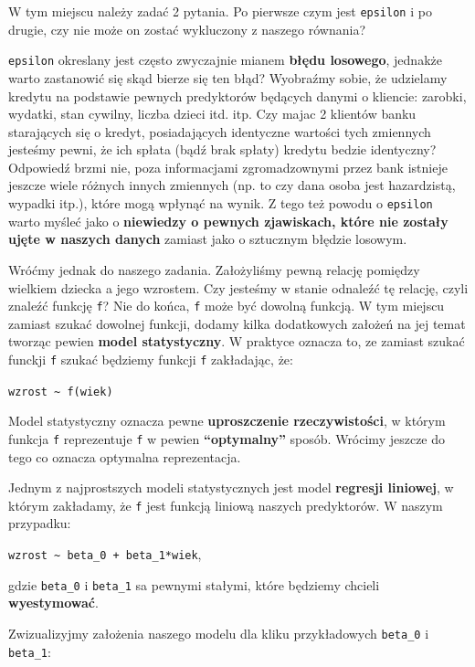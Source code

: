 \documentclass[
]{article}
\begin{document}
W tym miejscu należy zadać 2 pytania. Po pierwsze czym jest
\texttt{epsilon} i po drugie, czy nie może on zostać wykluczony z
naszego równania?

\texttt{epsilon} okreslany jest często zwyczajnie mianem \textbf{błędu
losowego}, jednakże warto zastanowić się skąd bierze się ten błąd?
Wyobraźmy sobie, że udzielamy kredytu na podstawie pewnych predyktorów
będących danymi o kliencie: zarobki, wydatki, stan cywilny, liczba
dzieci itd. itp. Czy majac 2 klientów banku starających się o kredyt,
posiadających identyczne wartości tych zmiennych jesteśmy pewni, że ich
spłata (bądź brak spłaty) kredytu bedzie identyczny? Odpowiedź brzmi
nie, poza informacjami zgromadzownymi przez bank istnieje jeszcze wiele
różnych innych zmiennych (np. to czy dana osoba jest hazardzistą,
wypadki itp.), które mogą wpłynąć na wynik. Z tego też powodu o
\texttt{epsilon} warto myśleć jako o \textbf{niewiedzy o pewnych
zjawiskach, które nie zostały ujęte w naszych danych} zamiast jako o
sztucznym błędzie losowym.

Wróćmy jednak do naszego zadania. Założyliśmy pewną relację pomiędzy
wielkiem dziecka a jego wzrostem. Czy jesteśmy w stanie odnaleźć tę
relację, czyli znaleźć funkcję \texttt{f}? Nie do końca, \texttt{f} może
być dowolną funkcją. W tym miejscu zamiast szukać dowolnej funkcji,
dodamy kilka dodatkowych założeń na jej temat tworząc pewien
\textbf{model statystyczny}. W praktyce oznacza to, ze zamiast szukać
funckji \texttt{f} szukać będziemy funkcji \texttt{f\textquotesingle{}}
zakładając, że:

\texttt{wzrost\ \textasciitilde{}\ f\textquotesingle{}(wiek)}

Model statystyczny oznacza pewne \textbf{uproszczenie rzeczywistości}, w
którym funkcja \texttt{f\textquotesingle{}} reprezentuje \texttt{f} w
pewien \textbf{``optymalny''} sposób. Wrócimy jeszcze do tego co oznacza
optymalna reprezentacja.

Jednym z najprostszych modeli statystycznych jest model \textbf{regresji
liniowej}, w którym zakładamy, że \texttt{f\textquotesingle{}} jest
funkcją liniową naszych predyktorów. W naszym przypadku:

\texttt{wzrost\ \textasciitilde{}\ beta\_0\ +\ beta\_1*wiek},

gdzie \texttt{beta\_0} i \texttt{beta\_1} sa pewnymi stałymi, które
będziemy chcieli \textbf{wyestymować}.

Zwizualizyjmy założenia naszego modelu dla kliku przykładowych
\texttt{beta\_0} i \texttt{beta\_1}:
\end{document}
